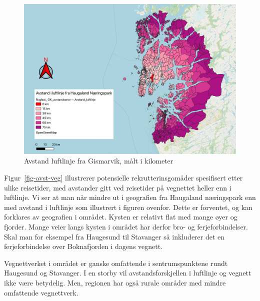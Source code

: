 \documentclass[
]{article}
\begin{document}
\begin{figure}[H]

{\centering \includegraphics{bilder/Avstand_luftlinje.png}

}

\caption{\label{fig-avst-luft}Avstand luftlinje fra Gismarvik, målt i
kilometer}

\end{figure}

Figur~\ref{fig-avst-veg} illustrerer potensielle rekrutterinsgomåder
spesifisert etter ulike reisetider, med avstander gitt ved reisetider på
vegnettet heller enn i luftlinje. Vi ser at man når mindre ut i
geografien fra Haugaland næringspark enn med avstand i luftlinje som
illustrert i figuren ovenfor. Dette er forventet, og kan forklares av
geografien i området. Kysten er relativt flat med mange øyer og fjorder.
Mange veier langs kysten i området har derfor bro- og ferjeforbindelser.
Skal man for eksempel fra Haugesund til Stavanger så inkluderer det en
ferjeforbindelse over Boknafjorden i dagens vegnett.

Vegnettverket i området er ganske omfattende i sentrumspunktene rundt
Haugesund og Stavanger. I en storby vil avstandsforskjellen i luftlinje
og vegnett ikke være betydelig. Men, regionen har også rurale områder
med mindre omfattende vegnettverk.
\end{document}
